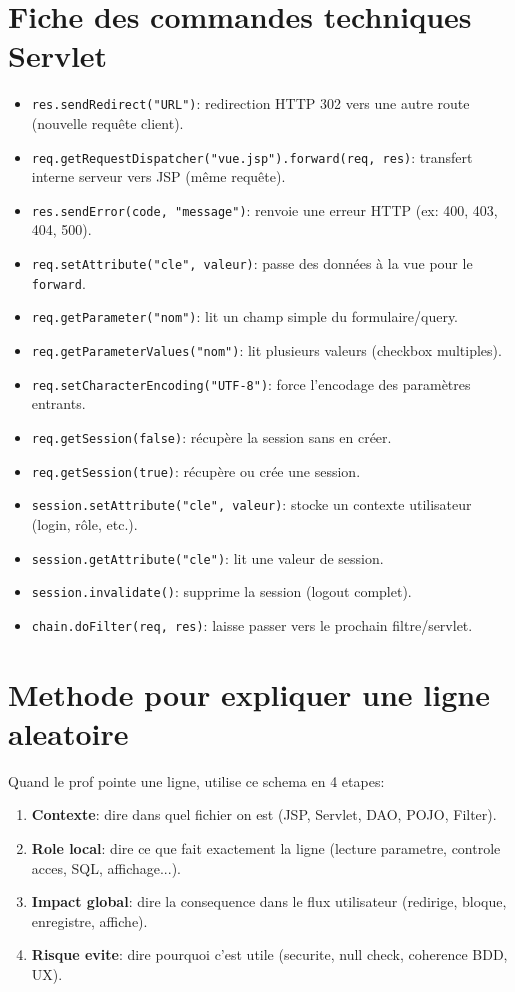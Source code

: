 ﻿\documentclass[11pt,a4paper]{article}
\begin{document}
\section{Fiche des commandes techniques Servlet}
\begin{itemize}
  \item \texttt{res.sendRedirect("URL")}: redirection HTTP 302 vers une autre route (nouvelle requête client).
  \item \texttt{req.getRequestDispatcher("vue.jsp").forward(req, res)}: transfert interne serveur vers JSP (même requête).
  \item \texttt{res.sendError(code, "message")}: renvoie une erreur HTTP (ex: 400, 403, 404, 500).
  \item \texttt{req.setAttribute("cle", valeur)}: passe des données à la vue pour le \texttt{forward}.
  \item \texttt{req.getParameter("nom")}: lit un champ simple du formulaire/query.
  \item \texttt{req.getParameterValues("nom")}: lit plusieurs valeurs (checkbox multiples).
  \item \texttt{req.setCharacterEncoding("UTF-8")}: force l'encodage des paramètres entrants.
  \item \texttt{req.getSession(false)}: récupère la session sans en créer.
  \item \texttt{req.getSession(true)}: récupère ou crée une session.
  \item \texttt{session.setAttribute("cle", valeur)}: stocke un contexte utilisateur (login, rôle, etc.).
  \item \texttt{session.getAttribute("cle")}: lit une valeur de session.
  \item \texttt{session.invalidate()}: supprime la session (logout complet).
  \item \texttt{chain.doFilter(req, res)}: laisse passer vers le prochain filtre/servlet.
\end{itemize}

\section{Methode pour expliquer une ligne aleatoire}
Quand le prof pointe une ligne, utilise ce schema en 4 etapes:
\begin{enumerate}
  \item \textbf{Contexte}: dire dans quel fichier on est (JSP, Servlet, DAO, POJO, Filter).
  \item \textbf{Role local}: dire ce que fait exactement la ligne (lecture parametre, controle acces, SQL, affichage...).
  \item \textbf{Impact global}: dire la consequence dans le flux utilisateur (redirige, bloque, enregistre, affiche).
  \item \textbf{Risque evite}: dire pourquoi c'est utile (securite, null check, coherence BDD, UX).
\end{enumerate}
\end{document}
